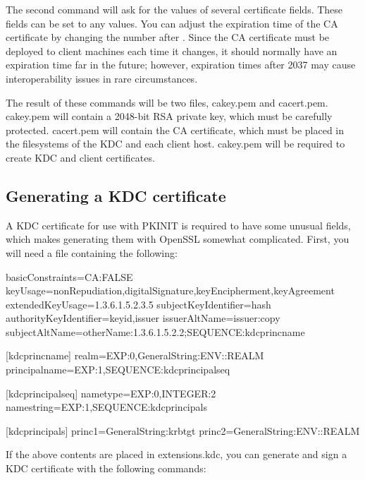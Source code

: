 \documentclass[letterpaper,10pt,english]{sphinxmanual}
\begin{document}
The second command will ask for the values of several certificate
fields.  These fields can be set to any values.  You can adjust the
expiration time of the CA certificate by changing the number after
.  Since the CA certificate must be deployed to client
machines each time it changes, it should normally have an expiration
time far in the future; however, expiration times after 2037 may cause
interoperability issues in rare circumstances.

The result of these commands will be two files, cakey.pem and
cacert.pem.  cakey.pem will contain a 2048-bit RSA private key, which
must be carefully protected.  cacert.pem will contain the CA
certificate, which must be placed in the filesystems of the KDC and
each client host.  cakey.pem will be required to create KDC and client
certificates.


\subsection{Generating a KDC certificate}
\label{\detokenize{admin/pkinit:generating-a-kdc-certificate}}
A KDC certificate for use with PKINIT is required to have some unusual
fields, which makes generating them with OpenSSL somewhat complicated.
First, you will need a file containing the following:

%
\begin{sphinxVerbatim}
basicConstraints=CA:FALSE
keyUsage=nonRepudiation,digitalSignature,keyEncipherment,keyAgreement
extendedKeyUsage=1.3.6.1.5.2.3.5
subjectKeyIdentifier=hash
authorityKeyIdentifier=keyid,issuer
issuerAltName=issuer:copy
subjectAltName=otherName:1.3.6.1.5.2.2;SEQUENCE:kdc\PYGZus{}princ\PYGZus{}name

[kdc\PYGZus{}princ\PYGZus{}name]
realm=EXP:0,GeneralString:\PYGZdl{}\PYGZob{}ENV::REALM\PYGZcb{}
principal\PYGZus{}name=EXP:1,SEQUENCE:kdc\PYGZus{}principal\PYGZus{}seq

[kdc\PYGZus{}principal\PYGZus{}seq]
name\PYGZus{}type=EXP:0,INTEGER:2
name\PYGZus{}string=EXP:1,SEQUENCE:kdc\PYGZus{}principals

[kdc\PYGZus{}principals]
princ1=GeneralString:krbtgt
princ2=GeneralString:\PYGZdl{}\PYGZob{}ENV::REALM\PYGZcb{}
\end{sphinxVerbatim}

If the above contents are placed in extensions.kdc, you can generate
and sign a KDC certificate with the following commands:
\end{document}
